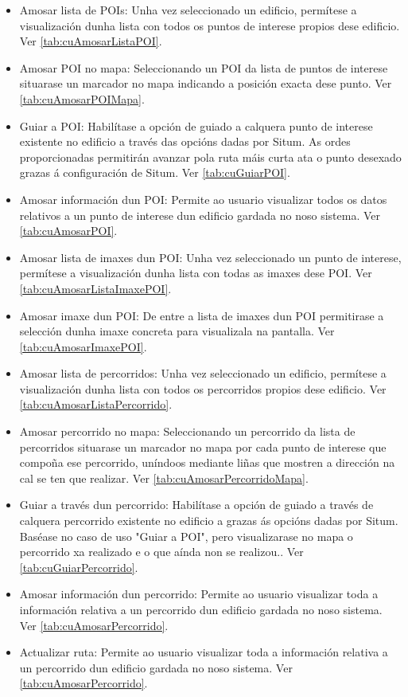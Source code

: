 \begin{itemize}
	\item Amosar lista de POIs: Unha vez seleccionado un edificio, permítese a visualización dunha lista con todos os puntos de interese propios dese edificio. Ver \ref{tab:cuAmosarListaPOI}.
	\item Amosar POI no mapa: Seleccionando un POI da lista de puntos de interese situarase un marcador no mapa indicando a posición exacta dese punto. Ver \ref{tab:cuAmosarPOIMapa}.
	\item Guiar a POI: Habilítase a opción de guiado a calquera punto de interese existente no edificio a través das opcións dadas por Situm. As ordes proporcionadas permitirán avanzar pola ruta máis curta ata o punto desexado grazas á configuración de Situm. Ver \ref{tab:cuGuiarPOI}.
	\item Amosar información dun POI: Permite ao usuario visualizar todos os datos relativos a un punto de interese dun edificio gardada no noso sistema. Ver \ref{tab:cuAmosarPOI}.
	\item Amosar lista de imaxes dun POI: Unha vez seleccionado un punto de interese, permítese a visualización dunha lista con todas as imaxes dese POI. Ver \ref{tab:cuAmosarListaImaxePOI}.
	\item Amosar imaxe dun POI: De entre a lista de imaxes dun POI permitirase a selección dunha imaxe concreta para visualizala na pantalla.  Ver \ref{tab:cuAmosarImaxePOI}.
	\item Amosar lista de percorridos: Unha vez seleccionado un edificio, permítese a visualización dunha lista con todos os percorridos propios dese edificio. Ver \ref{tab:cuAmosarListaPercorrido}.
	\item Amosar percorrido no mapa: Seleccionando un percorrido da lista de percorridos situarase un marcador no mapa por cada punto de interese que compoña ese percorrido, uníndoos mediante liñas que mostren a dirección na cal se ten que realizar. Ver \ref{tab:cuAmosarPercorridoMapa}.
	\item Guiar a través dun percorrido: Habilítase a opción de guiado a través de calquera percorrido existente no edificio a grazas ás opcións dadas por Situm. Baséase no caso de uso "Guiar a POI", pero visualizarase no mapa o percorrido xa realizado e o que aínda non se realizou.. Ver \ref{tab:cuGuiarPercorrido}.
	\item Amosar información dun percorrido: Permite ao usuario visualizar toda a información relativa a un percorrido dun edificio gardada no noso sistema. Ver \ref{tab:cuAmosarPercorrido}.
	\item Actualizar ruta: Permite ao usuario visualizar toda a información relativa a un percorrido dun edificio gardada no noso sistema. Ver \ref{tab:cuAmosarPercorrido}.
\end{itemize}


